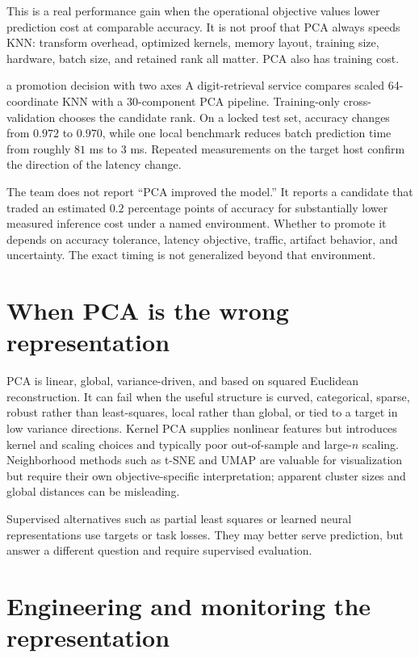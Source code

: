 This is a real performance gain when the operational objective values lower
prediction cost at comparable accuracy. It is not proof that PCA always speeds
KNN: transform overhead, optimized kernels, memory layout, training size,
hardware, batch size, and retained rank all matter. PCA also has training cost.

\begin{workedexample}{a promotion decision with two axes}
A digit-retrieval service compares scaled 64-coordinate KNN with a 30-component
PCA pipeline. Training-only cross-validation chooses the candidate rank. On a
locked test set, accuracy changes from $0.972$ to $0.970$, while one local
benchmark reduces batch prediction time from roughly $81$ ms to $3$ ms. Repeated
measurements on the target host confirm the direction of the latency change.

The team does not report ``PCA improved the model.'' It reports a candidate
that traded an estimated $0.2$ percentage points of accuracy for substantially
lower measured inference cost under a named environment. Whether to promote it
depends on accuracy tolerance, latency objective, traffic, artifact behavior,
and uncertainty. The exact timing is not generalized beyond that environment.
\end{workedexample}

\section{When PCA is the wrong representation}

PCA is linear, global, variance-driven, and based on squared Euclidean
reconstruction. It can fail when the useful structure is curved, categorical,
sparse, robust rather than least-squares, local rather than global, or tied to a
target in low variance directions. Kernel PCA supplies nonlinear features but
introduces kernel and scaling choices and typically poor out-of-sample and
large-$n$ scaling. Neighborhood methods such as t-SNE and UMAP are valuable for
visualization but require their own objective-specific interpretation; apparent
cluster sizes and global distances can be misleading.

Supervised alternatives such as partial least squares or learned neural
representations use targets or task losses. They may better serve prediction,
but answer a different question and require supervised evaluation.

\section{Engineering and monitoring the representation}

